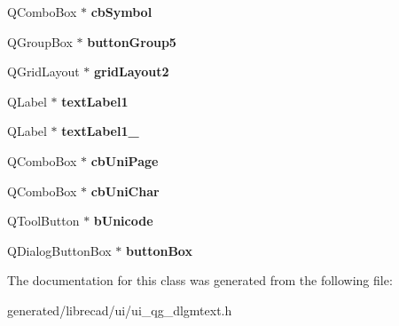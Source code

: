 \begin{DoxyCompactItemize}
\item 
\hypertarget{classUi__QG__DlgMText_af878369a29ff9b57bb4c7532e43d0d71}{Q\-Combo\-Box $\ast$ {\bfseries cb\-Symbol}}\label{classUi__QG__DlgMText_af878369a29ff9b57bb4c7532e43d0d71}

\item 
\hypertarget{classUi__QG__DlgMText_aa71b6071026011d9f681769c5c941159}{Q\-Group\-Box $\ast$ {\bfseries button\-Group5}}\label{classUi__QG__DlgMText_aa71b6071026011d9f681769c5c941159}

\item 
\hypertarget{classUi__QG__DlgMText_a7de302010db31c6fd30625df11800d41}{Q\-Grid\-Layout $\ast$ {\bfseries grid\-Layout2}}\label{classUi__QG__DlgMText_a7de302010db31c6fd30625df11800d41}

\item 
\hypertarget{classUi__QG__DlgMText_a0cc1dee2eddcda142098a3f225cd40ed}{Q\-Label $\ast$ {\bfseries text\-Label1}}\label{classUi__QG__DlgMText_a0cc1dee2eddcda142098a3f225cd40ed}

\item 
\hypertarget{classUi__QG__DlgMText_a88bdab823fed5fbaabc06b4b48e4bf2f}{Q\-Label $\ast$ {\bfseries text\-Label1\-\_}}\label{classUi__QG__DlgMText_a88bdab823fed5fbaabc06b4b48e4bf2f}

\item 
\hypertarget{classUi__QG__DlgMText_acc3ab366336f2c3cebc6d57f9b9a24ba}{Q\-Combo\-Box $\ast$ {\bfseries cb\-Uni\-Page}}\label{classUi__QG__DlgMText_acc3ab366336f2c3cebc6d57f9b9a24ba}

\item 
\hypertarget{classUi__QG__DlgMText_ae8970c65be1d97cffd49096bde8ce1df}{Q\-Combo\-Box $\ast$ {\bfseries cb\-Uni\-Char}}\label{classUi__QG__DlgMText_ae8970c65be1d97cffd49096bde8ce1df}

\item 
\hypertarget{classUi__QG__DlgMText_a1c524e75c4457232c355e457c128aeb0}{Q\-Tool\-Button $\ast$ {\bfseries b\-Unicode}}\label{classUi__QG__DlgMText_a1c524e75c4457232c355e457c128aeb0}

\item 
\hypertarget{classUi__QG__DlgMText_ac0d18103d411ed96d8d53e44055f55eb}{Q\-Dialog\-Button\-Box $\ast$ {\bfseries button\-Box}}\label{classUi__QG__DlgMText_ac0d18103d411ed96d8d53e44055f55eb}

\end{DoxyCompactItemize}


The documentation for this class was generated from the following file\-:\begin{DoxyCompactItemize}
\item 
generated/librecad/ui/ui\-\_\-qg\-\_\-dlgmtext.\-h\end{DoxyCompactItemize}
